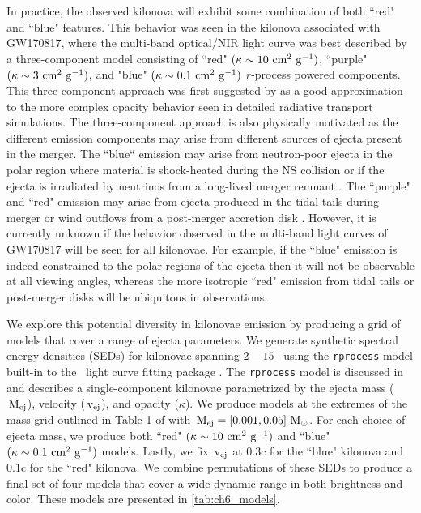 In practice, the observed kilonova will exhibit some combination of both ``red" and ``blue" features. This behavior was seen in the kilonova associated with GW170817, where the multi-band optical/NIR light curve was best described by a three-component model consisting of ``red"  $(\kappa \sim10 \rm\ cm^2\ g^{-1})$, ``purple"  $(\kappa \sim 3 \rm\ cm^2\ g^{-1})$, and "blue"  $(\kappa \sim 0.1 \rm\ cm^2\ g^{-1})$ $r$-process powered components. This three-component approach was first suggested by \citet{Tanaka+17} as a good approximation to the more complex opacity behavior seen in detailed radiative transport simulations. The three-component approach is also physically motivated as the different emission components may arise from different sources of ejecta present in the merger. The ``blue`` emission may arise from neutron-poor ejecta in the polar region where material is shock-heated during the NS collision \citep{Oechslin+07,Bauswein+13a,Sekiguchi+16} or if the ejecta is irradiated by neutrinos from a long-lived merger remnant \citep{FernandezMetzger13,Just+15,Kasen+15}. The ``purple" and ``red" emission may arise from ejecta produced in the tidal tails during merger \cite{Rosswog+99,Hotokezaka+13} or wind outflows from a post-merger accretion disk \citep{Just+15,SiegelMetzger17}. However, it is currently unknown if the behavior observed in the multi-band light curves of GW170817 will be seen for all kilonovae. For example, if the ``blue" emission is indeed constrained to the polar regions of the ejecta then it will not be observable at all viewing angles, whereas the more isotropic ``red" emission from tidal tails or post-merger disks will be ubiquitous in observations.

We explore this potential diversity in kilonovae emission by producing a grid of models that cover a range of ejecta parameters. We generate synthetic spectral energy densities (SEDs) for kilonovae spanning $2-15$ \micron\ using the {\tt rprocess} model built-in to the \mosfit\ light curve fitting package \citep{Guillochon+17b,Nicholl+17b}. The {\tt rprocess} model is discussed in \citet{Villar+17a} and describes a single-component kilonovae \citep{Metzger2017} parametrized by the ejecta mass ($\rm\,M_{\rm ej}$), velocity ($\rm\,v_{\rm ej}$), and opacity ($\kappa$). We produce models at the extremes of the mass grid outlined in Table 1 of \citet{Barnes+16} with $\rm\,M_{\rm ej} = [0.001, 0.05]\,{\rm\,M_\odot}$. For each choice of ejecta mass, we produce both ``red" $(\kappa \sim 10 \rm\ cm^2\ g^{-1})$ and ``blue" $(\kappa \sim 0.1 \rm\ cm^2\ g^{-1})$ models. Lastly, we fix $\rm\,v_{\rm ej}$ at 0.3c for the ``blue" kilonova and 0.1c for the ``red" kilonova. We combine permutations of these SEDs to produce a final set of four models that cover a wide dynamic range in both brightness and color. These models are presented in \cref{tab:ch6_models}.

